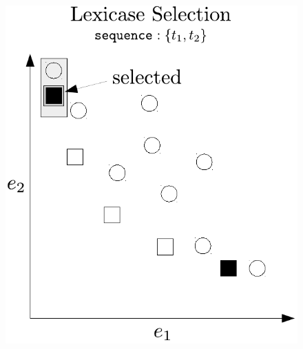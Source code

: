 \documentclass[twoside]{article}
\begin{document}
\begin{figure}[tb]
\begin{minipage}{0.49\textwidth}
\centering
  \includegraphics[width = \textwidth]{figs/lex_pareto.pdf}
\end{minipage}
\hspace{0.02\textwidth}
\begin{minipage}{0.49\textwidth}
\centering

\end{minipage}
\end{figure}
\end{document}
